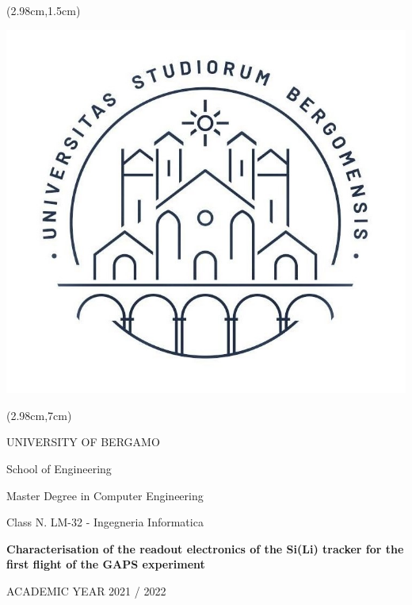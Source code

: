 \thispagestyle{empty}
\begin{textblock*}{\textwidth}(2.98cm,1.5cm)
    \begin{center}
        \includegraphics[scale=0.4]{Images/logo_unibg.jpg}  
    \end{center}
\end{textblock*}

\begin{textblock*}{\textwidth}(2.98cm,7cm)
    \begin{center}
        \large
        UNIVERSITY OF BERGAMO
    \end{center}
    \begin{center}
        School of Engineering
    \end{center}
    \vspace{-0.65cm}
    \begin{center}
        Master Degree in Computer Engineering
    \end{center}
    \vspace{-0.65cm}
    \begin{center}
        Class N. LM-32 - Ingegneria Informatica
    \end{center}
    \vspace{1cm}
    \begin{center}
        \LARGE
        \textbf{Characterisation of the readout electronics of the Si(Li) tracker for the first flight of the GAPS experiment}
    \end{center}
    \vspace{10.5cm}
    \begin{center}
         ACADEMIC YEAR 2021 / 2022
    \end{center}
\end{textblock*}

